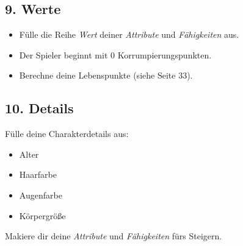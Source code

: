 \documentclass[a4paper,10pt,twoside,twocolumn,openany,nodeprecatedcode,bg=print]{dndbook}
\begin{document}
\subsection[]{9. Werte}
\begin{itemize}
  \item Fülle die Reihe \textit{Wert} deiner \textit{Attribute} und \textit{Fähigkeiten} aus.
  \item Der Spieler beginnt mit 0 Korrumpierungspunkten.
  \item Berechne deine Lebenspunkte (siehe Seite 33).
\end{itemize}


\subsection[]{10. Details}
Fülle deine Charakterdetails aus:
\begin{itemize}
  \item Alter
  \item Haarfarbe
  \item Augenfarbe
  \item Körpergröße
\end{itemize}

Makiere dir deine \textit{Attribute} und \textit{Fähigkeiten} fürs Steigern.
\end{document}
